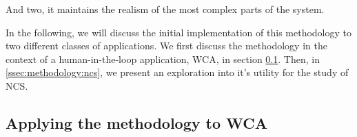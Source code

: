 And two, it maintains the realism of the most complex parts of the system.


In the following, we will discuss the initial implementation of this methodology to two different classes of applications.
We first discuss the methodology in the context of a human-in-the-loop application, \acl{WCA}, in section \cref{ssec:methodology:wca}.
Then, in \cref{ssec:methodology:ncs}, we present an exploration into it's utility for the study of \acf{NCS}.


\subsection{Applying the methodology to \acs{WCA}}\label{ssec:methodology:wca}

